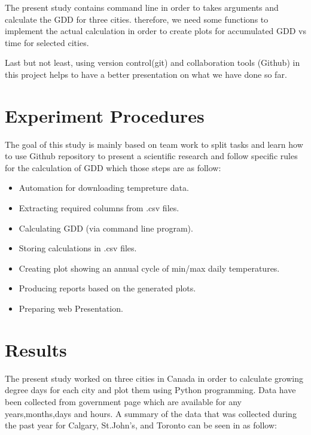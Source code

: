 \documentclass[DIV=calc, paper=a4, fontsize=11pt, twocolumn]{scrartcl}
\begin{document}
The present study contains command line in order to takes arguments and calculate the GDD for three cities. therefore, we need some functions to implement the actual calculation in order to create plots for accumulated GDD vs time for selected cities.

Last but not least, using version control(git) and collaboration tools (Github) in this project helps to have a better presentation on what we have done so far.


\section{Experiment Procedures}
The goal of this study is mainly based on team work to split tasks and learn how to use Github repository to present a scientific research and follow specific rules for the calculation of GDD which those steps are as follow:

\begin{itemize}
\item Automation for downloading tempreture data.
\item Extracting required columns from .csv files.
\item Calculating GDD (via command line program).
\item Storing calculations in .csv files.
\item Creating plot showing an annual cycle of min/max daily temperatures.
\item Producing reports based on the generated plots.
\item Preparing web Presentation.
\end{itemize}
\section{Results}
The present study worked on three cities in Canada in order to calculate growing degree days for each city and plot them using Python programming. Data have been collected from government page which are available for any years,months,days and hours. 
A summary of the data that was collected during the past year for Calgary, St.John's, and Toronto can be seen in as follow:
\end{document}
